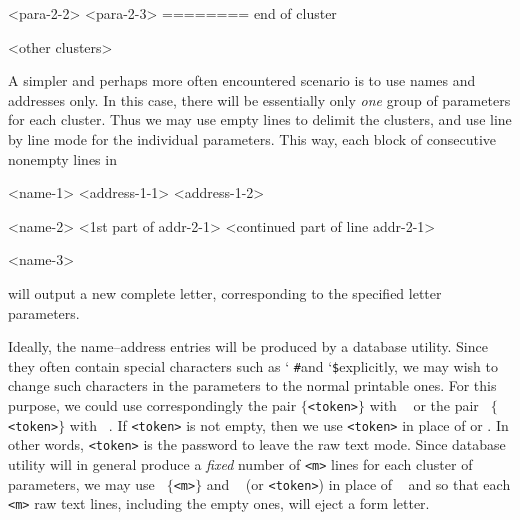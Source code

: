 {   <para-2-2>
   <para-2-3>
   ========   end of cluster

   <other clusters>
  \endblockmode
\unsetraw

\medskip
A simpler and perhaps more often encountered scenario is
to use names and addresses only. In this case, there will be
essentially only {\sl one} group of parameters for each cluster.
Thus we may use empty lines to delimit the clusters, and use line
by line mode for the individual parameters. This way, each
block of consecutive nonempty lines in

\setraw
  \beginlinemode
    <name-1>
    <address-1-1>
    <address-1-2>

    <name-2>
    <1st part of addr-2-1>  %
    <continued part of line addr-2-1>

    <name-3>      %
  \endlinemode
\unsetraw


will output a new complete letter, corresponding to the specified
letter parameters.


\medskip
{\smooth
Ideally, the name--address entries will be produced by a database
utility. Since they often contain special characters such as \lq
{\tt \#}\rqs and \lq{\tt \$}\rqs explicitly, we may wish to
change such characters in the parameters to the normal printable
ones. For this purpose, we could use correspondingly the pair
{\tt \string\beginrawblockmode$\{$<token>$\}$} with {\tt
\string\endrawblockmode} or the pair {\tt
\string\beginrawlinemode$\{$<token>$\}$} with {\tt
\string\endrawlinemode}. If {\tt <token>} is not empty, then we
use {\tt <token>} in place of {\tt \string\endrawblockmode} or
{\tt \string\endrawlinemode}. In other words, {\tt <token>} is
the password to leave the raw text mode.  Since database utility
will in general produce a {\sl fixed} number of {\tt <m>} lines
for each cluster of parameters, we may use {\tt
\string\begindatamode[<token>]$\{$<m>$\}$} and {\tt
\string\enddatamode} (or {\tt<token>}) in place of {\tt
\string\beginrawlinemode} and {\tt\string\endrawlinemode} so that
each {\tt<m>} raw text lines, including the empty ones, will eject
a form letter.
}


\medskip

}
